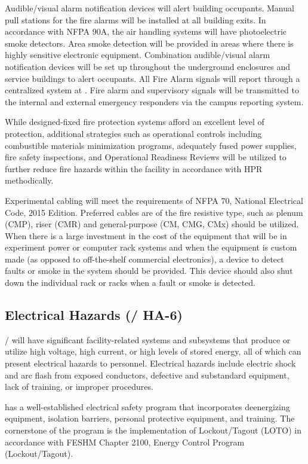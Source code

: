 Audible/visual alarm notification devices will alert building
occupants.  Manual pull stations for the fire alarms will be installed
at all building exits.  In accordance with NFPA 90A, the air handling
systems will have photoelectric smoke detectors.  Area smoke detection
will be provided in areas where there is highly sensitive electronic
equipment.  Combination audible/visual alarm notification devices will
be set up throughout the underground enclosures and service buildings
to alert occupants. All Fire Alarm signals will report through a
centralized system at \surf.  Fire alarm and supervisory signals will
be transmitted to the internal and external emergency responders via
the campus reporting system.

While designed-fixed fire protection systems afford an excellent level
of protection, additional strategies such as operational controls
including combustible materials minimization programs, adequately
fused power supplies, fire safety inspections, and Operational
Readiness Reviews will be utilized to further reduce fire hazards
within the facility in accordance with  HPR methodically.

Experimental cabling will meet the requirements of NFPA 70, National
Electrical Code, 2015 Edition.  Preferred cables are of the fire
resistive type, such as plenum (CMP), riser (CMR) and
general-purpose (CM, CMG, CMx) should be utilized.  When there is a
large investment in the cost of the equipment that will be in
experiment power or computer rack systems and when the equipment is
custom made (as opposed to off-the-shelf commercial electronics), a
device to detect faults or smoke in the system should be provided.
This device should also shut down the individual rack or racks when a
fault or smoke is detected.


\subsection{Electrical Hazards (/ HA-6)}

/ will have significant facility-related systems and
subsystems that produce or utilize high voltage, high current, or high
levels of stored energy, all of which can present electrical hazards
to personnel. Electrical hazards include electric shock and arc flash
from exposed conductors, defective and substandard equipment, lack of
training, or improper procedures.

\fnal has a well-established electrical safety program that
incorporates deenergizing equipment, isolation barriers, personal
protective equipment, and training. The cornerstone of the program is
the implementation of Lockout/Tagout (LOTO) in accordance with FESHM
Chapter 2100, \fnal Energy Control Program (Lockout/Tagout).

